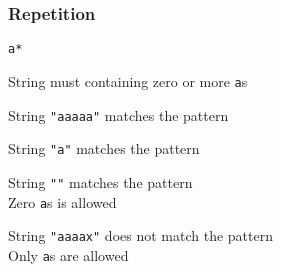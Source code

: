 \begin{frame}
  \frametitle{Repetition}
  \begin{center}
    \texttt{a*}
  \end{center}
  \begin{center}
    String must containing zero or more \texttt{a}s
  \end{center}
  \begin{overprint}
    \begin{center}
      String \texttt{"aaaaa"} matches the pattern \\[2mm]
    \end{center}

    \begin{center}
      String \texttt{"a"} matches the pattern \\[2mm]
    \end{center}

    \begin{center}
      String \texttt{""} matches the pattern \\[2mm]
      Zero \texttt{a}s is allowed
    \end{center}

    \begin{center}
      String \texttt{"aaaax"} does not match the pattern \\[2mm]
      Only \texttt{a}s are allowed
    \end{center}
  \end{overprint}
\end{frame}

